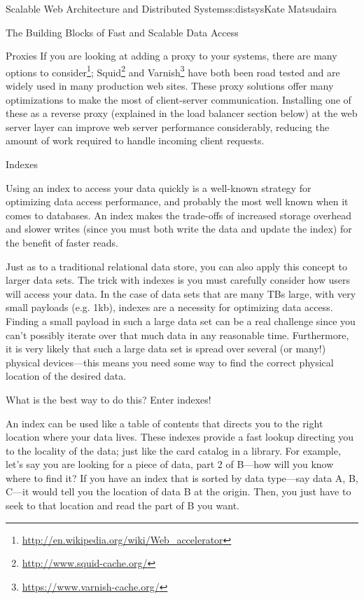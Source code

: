 \begin{aosachapter}{Scalable Web Architecture and Distributed Systems}{s:distsys}{Kate Matsudaira}
\begin{aosasect1}{The Building Blocks of Fast and Scalable Data Access}
\begin{aosasect2}{Proxies}
If you are looking at adding a proxy to your systems, there are many
options to
consider\footnote{\url{http://en.wikipedia.org/wiki/Web_accelerator}};
Squid\footnote{\url{http://www.squid-cache.org/}} and
Varnish\footnote{\url{https://www.varnish-cache.org/}} have both been
road tested and are widely used in many production web sites. These
proxy solutions offer many optimizations to make the most of
client-server communication. Installing one of these as a reverse
proxy (explained in the load balancer section below) at the web server
layer can improve web server performance considerably, reducing the
amount of work required to handle incoming client requests.

\end{aosasect2}

\begin{aosasect2}{Indexes}

Using an index to access your data quickly is a well-known strategy
for optimizing data access performance, and probably the most well
known when it comes to databases. An index makes the trade-offs of
increased storage overhead and slower writes (since you must both
write the data and update the index) for the benefit of faster reads.

Just as to a traditional relational data store, you can also apply
this concept to larger data sets. The trick with indexes is you must
carefully consider how users will access your data. In the case of
data sets that are many TBs large, with very small payloads
(e.g. 1kb), indexes are a necessity for optimizing data
access. Finding a small payload in such a large data set can be a real
challenge since you can’t possibly iterate over that much data in any
reasonable time. Furthermore, it is very likely that such a large data
set is spread over several (or many!) physical devices---this means
you need some way to find the correct physical location of the desired
data.

What is the best way to do this? Enter indexes!

An index can be used like a table of contents that directs you to the
right location where your data lives. These indexes provide a fast
lookup directing you to the locality of the data; just like the card
catalog in a library. For example, let’s say you are looking for a
piece of data, part 2 of B---how will you know where to find it? If
you have an index that is sorted by data type---say data A, B, C---it
would tell you the location of data B at the origin. Then, you just
have to seek to that location and read the part of B you want.


\end{aosasect2}
\end{aosasect1}
\end{aosachapter}

